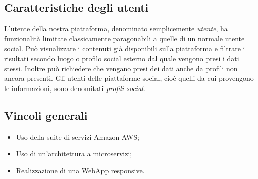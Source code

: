 \subsection{Caratteristiche degli utenti}
L'utente della nostra piattaforma, denominato semplicemente \textit{utente}, ha funzionalità limitate classicamente paragonabili a quelle di un normale utente social.
Può visualizzare i contenuti già disponibili sulla piattaforma e filtrare i risultati secondo luogo o profilo social esterno dal quale vengono presi i dati stessi.
Inoltre può richiedere che vengano presi dei dati anche da profili non ancora presenti.
Gli utenti delle piattaforme social, cioè quelli da cui provengono le informazioni, sono denomitati \textit{profili social}.

\subsection{Vincoli generali}
\begin{itemize}
	\item Uso della suite di servizi Amazon AWS\G{};
	\item Uso di un'architettura a microservizi;
	\item Realizzazione di una WebApp responsive.
\end{itemize}
